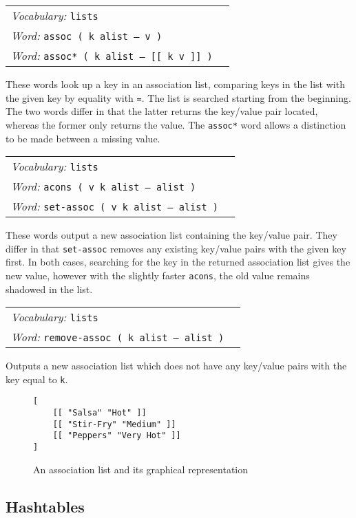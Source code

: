 \documentclass{book}
\newcommand{\vocabulary}[1]{\emph{Vocabulary:} \texttt{#1}&\\}
\newcommand{\ordinaryword}[2]{\index{\texttt{#1}}\emph{Word:} \texttt{#2}&\\}
\newcommand{\wordtable}[1]{


\begin{tabularx}{12cm}{lX}
\hline
#1
\hline
\end{tabularx}

}
\begin{document}
\wordtable{
\vocabulary{lists}
\ordinaryword{assoc}{assoc ( k alist -- v )}
\ordinaryword{assoc*}{assoc* ( k alist -- [[ k v ]] )}
}
These words look up a key in an association list, comparing keys in the list with the given key by equality with \texttt{=}. The list is searched starting from the beginning. The two words differ in that the latter returns the key/value pair located, whereas the former only returns the value. The \texttt{assoc*} word allows a distinction to be made between a missing value.
\wordtable{
\vocabulary{lists}
\ordinaryword{acons}{acons ( v k alist -- alist )}
\ordinaryword{set-assoc}{set-assoc ( v k alist -- alist )}
}
These words output a new association list containing the key/value pair.
They differ in that \texttt{set-assoc} removes any existing key/value pairs with the given key first. In both cases, searching for the key in the returned association list gives the new value, however with the slightly faster \texttt{acons}, the old value remains shadowed in the list.
\wordtable{
\vocabulary{lists}
\ordinaryword{remove-assoc}{remove-assoc ( k alist -- alist )}

}
Outputs a new association list which does not have any key/value pairs with the key equal to \texttt{k}.

\begin{figure}
\caption{An association list and its graphical representation}
\begin{verbatim}
[
    [[ "Salsa" "Hot" ]]
    [[ "Stir-Fry" "Medium" ]]
    [[ "Peppers" "Very Hot" ]]
]
\end{verbatim}

\begin{center}
\end{center}
\end{figure}

\subsection{Hashtables}\label{hashtables}
\end{document}
